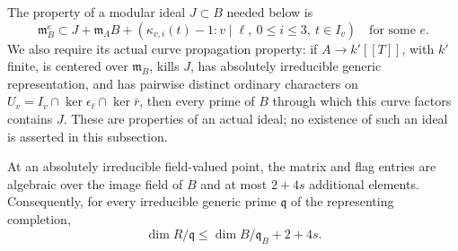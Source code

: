 The property of a modular ideal \(J\subset B\) needed below is
\begin{equation}\label{eq:sr-pm-finite}
 \mathfrak m_B^e\subset J+\mathfrak m_\Lambda B+
 (\kappa_{v,i}(t)-1:v\mid\ell,\ 0\le i\le3,\ t\in I_v)
 \quad\text{for some }e.
\end{equation}
We also require its actual curve propagation property:
if \(A\to k'[[T]]\), with \(k'\) finite, is centered over
\(\mathfrak m_B\), kills \(J\), has absolutely irreducible
generic representation, and has pairwise distinct ordinary
characters on
\(U_v=I_v\cap\ker\epsilon_\ell\cap\ker\bar r\),
then every prime of \(B\) through which this curve factors
contains \(J\). These are properties of an actual ideal; no
existence of such an ideal is asserted in this subsection.

\begin{srlemma}\label{lem:sr-four-trace-fiber}
At an absolutely irreducible field-valued point, the matrix and
flag entries are algebraic over the image field of \(B\) and
at most \(2+4s\) additional elements. Consequently, for every
irreducible generic prime \(\mathfrak q\) of the representing
completion,
\[
 \dim R/\mathfrak q\le
       \dim B/\mathfrak q_B+2+4s.
\]
\end{srlemma}
